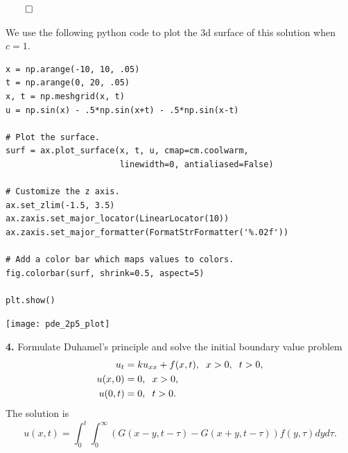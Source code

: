 \documentclass{article}
\begin{document}
\begin{flushright}
\( \qed \)
\end{flushright}
We use the following python code to plot the 3d surface of this solution when \(c=1\). 
\begin{multicols}{2}
\begin{verbatim}
x = np.arange(-10, 10, .05)
t = np.arange(0, 20, .05)
x, t = np.meshgrid(x, t)
u = np.sin(x) - .5*np.sin(x+t) - .5*np.sin(x-t)

# Plot the surface.
surf = ax.plot_surface(x, t, u, cmap=cm.coolwarm,
                       linewidth=0, antialiased=False)

# Customize the z axis.
ax.set_zlim(-1.5, 3.5)
ax.zaxis.set_major_locator(LinearLocator(10))
ax.zaxis.set_major_formatter(FormatStrFormatter('%.02f'))

# Add a color bar which maps values to colors.
fig.colorbar(surf, shrink=0.5, aspect=5)

plt.show()
\end{verbatim}

\begin{flushright}
\texttt{[image: pde\_2p5\_plot]}
\end{flushright}
\end{multicols}
\newpage
\textbf{4.} Formulate Duhamel's principle and solve the initial boundary value problem 
\begin{align*}
u_{t} &= ku_{xx} + f(x,t),  \hspace{2mm} x>0, \hspace{2mm} t>0, \\
u(x,0) &=0, \hspace{2mm} x>0, \\
u(0,t) &= 0, \hspace{2mm} t>0. 
\end{align*}
 The solution is
 \[
 u(x,t) = \int_0^t \int_0^\infty (G(x-y,t-\tau) - G(x+y,t-\tau))f(y,\tau)dyd\tau.
 \]
\end{document}
